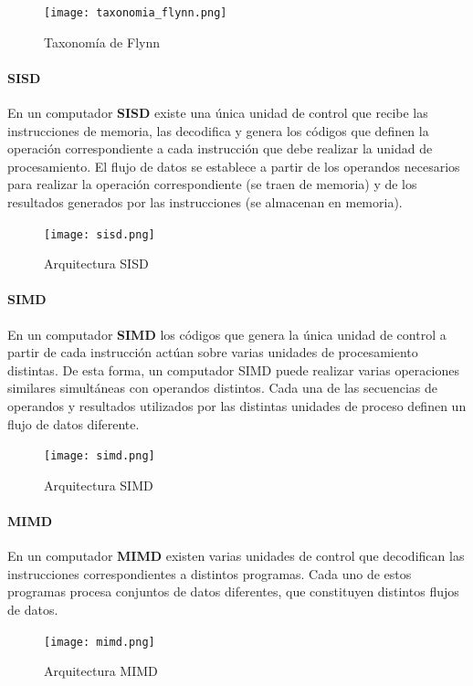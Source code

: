 \documentclass[12pt,spanish]{article}
\begin{document}
\begin{figure}[H]
\centering
\texttt{[image: taxonomia\_flynn.png]}
\caption{Taxonomía de Flynn}
\end{figure}
\paragraph{SISD}
En un computador \textbf{SISD} existe una única unidad de control que recibe las instrucciones de memoria, las decodifica y genera los códigos que definen la operación correspondiente a cada instrucción que debe realizar la unidad de procesamiento. El flujo de datos se establece a partir de los operandos necesarios para realizar la operación correspondiente (se traen de memoria) y de los resultados generados por las instrucciones (se almacenan en memoria).

\begin{figure}[H]
\centering
\texttt{[image: sisd.png]}
\caption{Arquitectura SISD}
\end{figure}

\paragraph{SIMD}

En un computador \textbf{SIMD} los códigos que genera la única unidad de control a partir de cada instrucción actúan sobre varias unidades de procesamiento distintas. De esta forma, un computador SIMD puede realizar varias operaciones similares simultáneas con operandos distintos. Cada una de las secuencias de operandos y resultados utilizados por las distintas unidades de proceso definen un flujo de datos diferente.

\begin{figure}[H]
\centering
\texttt{[image: simd.png]}
\caption{Arquitectura SIMD}
\end{figure}

\paragraph{MIMD}

En un computador \textbf{MIMD} existen varias unidades de control que decodifican las instrucciones correspondientes a distintos programas. Cada uno de estos programas procesa conjuntos de datos diferentes, que constituyen distintos flujos de datos.

\begin{figure}[H]
\centering
\texttt{[image: mimd.png]}
\caption{Arquitectura MIMD}
\end{figure}
\end{document}
